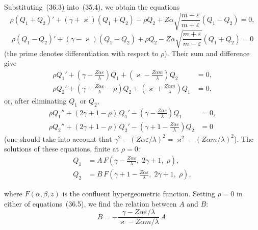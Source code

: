 Substituting~(36.3) into~(35.4), we obtain the equations
\[
\rho(Q_1 + Q_2)' + (\gamma + \varkappa)(Q_1 + Q_2) - \rho Q_2 + Z\alpha\sqrt{\frac{m-\varepsilon}{m+\varepsilon}}(Q_1 - Q_2) = 0,
\]
\[
\rho(Q_1 - Q_2)' + (\gamma - \varkappa)(Q_1 - Q_2) + \rho Q_2 - Z\alpha\sqrt{\frac{m+\varepsilon}{m-\varepsilon}}(Q_1 + Q_2) = 0
\]
(the prime denotes differentiation with respect to $\rho$). Their sum and difference give
\begin{equation}
\begin{aligned}
\rho Q_1' + \left(\gamma - \frac{Z\alpha\varepsilon}{\lambda}\right)Q_1 + \left(\varkappa - \frac{Z\alpha m}{\lambda}\right)Q_2 &= 0,\\[4pt]
\rho Q_2' + \left(\gamma + \frac{Z\alpha\varepsilon}{\lambda} - \rho\right)Q_2 + \left(\varkappa + \frac{Z\alpha m}{\lambda}\right)Q_1 &= 0,
\end{aligned}
\tag{36.5}
\end{equation}
or, after eliminating $Q_1$ or $Q_2$,
\begin{equation}
\begin{aligned}
\rho Q_1'' + (2\gamma + 1 - \rho)\,Q_1' - \left(\gamma - \frac{Z\alpha\varepsilon}{\lambda}\right)Q_1 &= 0,\\[4pt]
\rho Q_2'' + (2\gamma + 1 - \rho)\,Q_2' - \left(\gamma + 1 - \frac{Z\alpha\varepsilon}{\lambda}\right)Q_2 &= 0
\end{aligned}
\tag{36.6}
\end{equation}
(one should take into account that $\gamma^2 - (Z\alpha\varepsilon/\lambda)^2 = \varkappa^2 - (Z\alpha m/\lambda)^2$). The solutions of these equations, finite at $\rho = 0$:
\begin{equation}
\begin{aligned}
Q_1 &= A\,F\!\left(\gamma - \frac{Z\alpha\varepsilon}{\lambda},\;2\gamma+1,\;\rho\right),\\[4pt]
Q_2 &= B\,F\!\left(\gamma + 1 - \frac{Z\alpha\varepsilon}{\lambda},\;2\gamma+1,\;\rho\right),
\end{aligned}
\tag{36.6}
\end{equation}

where $F(\alpha,\beta,z)$ is the confluent hypergeometric function. Setting $\rho = 0$ in either of equations~(36.5), we find the relation between $A$ and $B$:
\begin{equation}
B = -\frac{\gamma - Z\alpha\varepsilon/\lambda}{\varkappa - Z\alpha m/\lambda}\,A.
\tag{36.7}
\end{equation}

